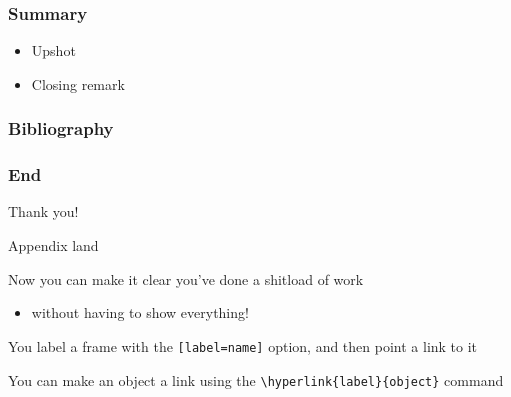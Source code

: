 \documentclass[11pt, aspectratio=169]{beamer}
\begin{document}
\begin{frame}[t]\frametitle{Summary}
%
\begin{itemize}
\item Upshot
\item Closing remark
\end{itemize}

\end{frame}

\begin{frame}[t]\frametitle{Bibliography}
\printbibliography
\end{frame}
\begin{frame}[t]\frametitle{End}
\begin{center}
\Huge
Thank you!
\end{center}
\end{frame}
\appendix
\begin{frame}[label=appendix_end]{Appendix land}
  \begin{wideitemize}
    \item[] Now you can make it clear you've done a shitload of work
      \begin{itemize}
      \item[]  without having to show everything! \hyperlink{data_slide}{}
      \end{itemize}
    \item[] You label a frame with the \texttt{[label=name]} option, and then point a link to it
    \item[] You can make an object a link using the \texttt{\textbackslash hyperlink\{label\}\{object\}} command
  \end{wideitemize}
\end{frame}
\end{document}
